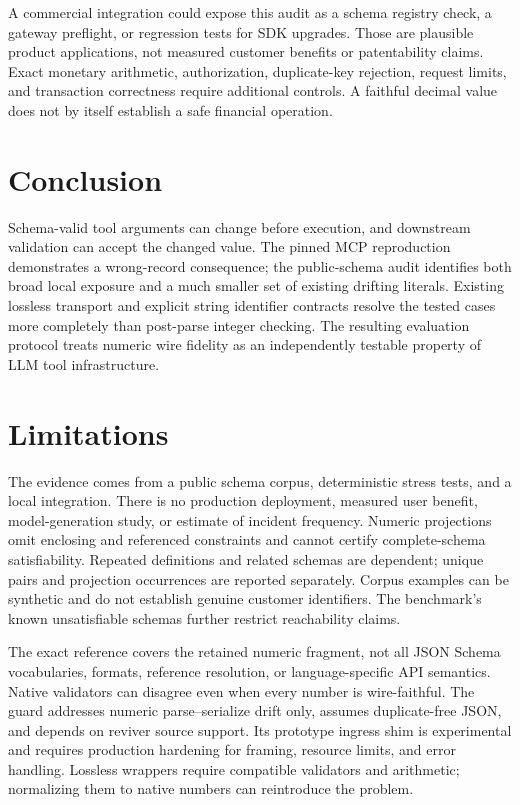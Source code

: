 \documentclass[11pt]{article}
\begin{document}
A commercial integration could expose this audit as a schema registry check, a gateway preflight, or regression tests for SDK upgrades. Those are plausible product applications, not measured customer benefits or patentability claims. Exact monetary arithmetic, authorization, duplicate-key rejection, request limits, and transaction correctness require additional controls. A faithful decimal value does not by itself establish a safe financial operation.

\section{Conclusion}
Schema-valid tool arguments can change before execution, and downstream validation can accept the changed value. The pinned MCP reproduction demonstrates a wrong-record consequence; the public-schema audit identifies both broad local exposure and a much smaller set of existing drifting literals. Existing lossless transport and explicit string identifier contracts resolve the tested cases more completely than post-parse integer checking. The resulting evaluation protocol treats numeric wire fidelity as an independently testable property of LLM tool infrastructure.

\section*{Limitations}
The evidence comes from a public schema corpus, deterministic stress tests, and a local integration. There is no production deployment, measured user benefit, model-generation study, or estimate of incident frequency. Numeric projections omit enclosing and referenced constraints and cannot certify complete-schema satisfiability. Repeated definitions and related schemas are dependent; unique pairs and projection occurrences are reported separately. Corpus examples can be synthetic and do not establish genuine customer identifiers. The benchmark's known unsatisfiable schemas further restrict reachability claims.

The exact reference covers the retained numeric fragment, not all JSON Schema vocabularies, formats, reference resolution, or language-specific API semantics. Native validators can disagree even when every number is wire-faithful. The guard addresses numeric parse--serialize drift only, assumes duplicate-free JSON, and depends on reviver source support. Its prototype ingress shim is experimental and requires production hardening for framing, resource limits, and error handling. Lossless wrappers require compatible validators and arithmetic; normalizing them to native numbers can reintroduce the problem.
\end{document}
